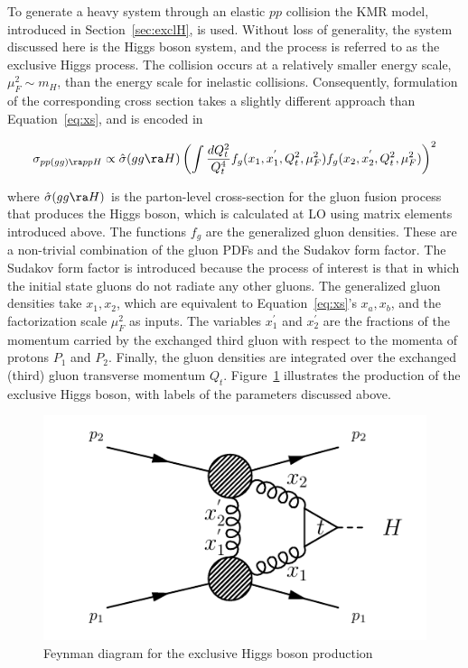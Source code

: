 \par To generate a heavy system through an elastic $pp$ collision the KMR model, introduced 
in Section~\ref{sec:exclH}, is used. Without loss of generality, the system discussed here is the Higgs boson system, 
and the process is referred to as the exclusive Higgs process. 
The collision occurs at a relatively smaller energy scale, $\mu_F^2\sim m_H$, than the energy scale 
for inelastic collisions. Consequently, formulation of the corresponding cross section takes a slightly
different approach than Equation~\ref{eq:xs}, and is encoded in 

\begin{equation}
\sigma_{pp(gg)\ra ppH} \propto \hat{\sigma}(gg\ra H)\left ( \int \frac{dQ^2_t}{Q^4_t}f_g(x_1, x_1^{'},Q^2_t, \mu_F^2)f_g(x_2, x_2^{'},Q^2_t, \mu_F^2)\right )^2 
\end{equation}

where $\hat{\sigma}(gg\ra H)$ is the parton-level cross-section
for the gluon fusion process that produces the Higgs boson, which is 
calculated at LO using matrix elements introduced above.  
The functions $f_g$ are the generalized gluon densities. These are a non-trivial 
combination of the gluon PDFs and the Sudakov form factor. The Sudakov 
form factor is introduced because the process of interest is that in which 
the initial state gluons do not radiate any other gluons. The generalized gluon 
densities take $x_1,x_2$, which are equivalent to Equation~\ref{eq:xs}'s $x_a,x_b$, 
and the factorization scale $\mu_F^2$ as inputs.   
The variables $x_1^{'}$ and $x_2^{'}$ are the fractions 
of the momentum carried by the exchanged third gluon with respect to the momenta of
protons $P_1$ and $P_2$.
Finally, the gluon densities are integrated over the exchanged (third) gluon 
transverse momentum $Q_t$. Figure~\ref{fig:exclHa} illustrates the production of the exclusive 
Higgs boson, with labels of the parameters discussed above.  

\begin{figure}[!h]
\centering
\includegraphics[width=0.8\linewidth]{figures/exclH.pdf}
\caption{Feynman diagram for the exclusive Higgs boson production} 
\label{fig:exclHa}
\end{figure}

